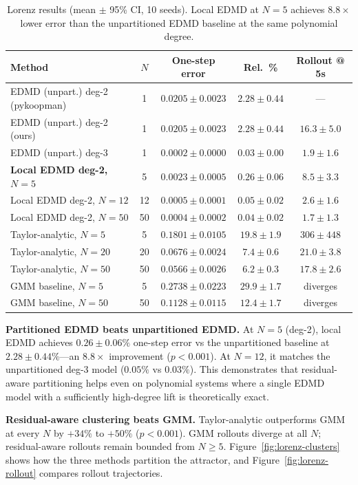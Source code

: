 \documentclass[11pt]{article}
\theoremstyle{definition}
\begin{document}
\begin{table}[H]
\centering\small
\begin{tabular}{lcccc}
\toprule
Method & $N$ & One-step error & Rel.\ \% & Rollout @ 5s \\
\midrule
EDMD (unpart.) deg-2 (pykoopman) & 1  & $0.0205\pm0.0023$ & $2.28\pm0.44$ & --- \\
EDMD (unpart.) deg-2 (ours)      & 1  & $0.0205\pm0.0023$ & $2.28\pm0.44$ & $16.3\pm5.0$ \\
EDMD (unpart.) deg-3             & 1  & $0.0002\pm0.0000$ & $0.03\pm0.00$ & $1.9\pm1.6$ \\
\midrule
\textbf{Local EDMD deg-2, $N\!=\!5$}  & 5  & $\mathbf{0.0023\pm0.0005}$ & $\mathbf{0.26\pm0.06}$ & $\mathbf{8.5\pm3.3}$ \\
Local EDMD deg-2, $N\!=\!12$ & 12 & $0.0005\pm0.0001$ & $0.05\pm0.02$ & $2.6\pm1.6$ \\
Local EDMD deg-2, $N\!=\!50$ & 50 & $0.0004\pm0.0002$ & $0.04\pm0.02$ & $1.7\pm1.3$ \\
\midrule
Taylor-analytic, $N\!=\!5$   & 5  & $0.1801\pm0.0105$ & $19.8\pm1.9$ & $306\pm448$ \\
Taylor-analytic, $N\!=\!20$  & 20 & $0.0676\pm0.0024$ & $7.4\pm0.6$ & $21.0\pm3.8$ \\
Taylor-analytic, $N\!=\!50$  & 50 & $0.0566\pm0.0026$ & $6.2\pm0.3$ & $17.8\pm2.6$ \\
\midrule
GMM baseline, $N\!=\!5$      & 5  & $0.2738\pm0.0223$ & $29.9\pm1.7$ & diverges \\
GMM baseline, $N\!=\!50$     & 50 & $0.1128\pm0.0115$ & $12.4\pm1.7$ & diverges \\
\bottomrule
\end{tabular}
\caption{Lorenz results (mean $\pm$ 95\% CI, 10 seeds). Local EDMD at $N\!=\!5$ achieves $8.8\times$ lower error than the unpartitioned EDMD baseline at the same polynomial degree.}
\label{tab:lorenz}
\end{table}

\textbf{Partitioned EDMD beats unpartitioned EDMD.} At $N=5$ (deg-2), local EDMD achieves $0.26\pm0.06\%$ one-step error vs the unpartitioned baseline at $2.28\pm0.44\%$---an $8.8\times$ improvement ($p<0.001$). At $N=12$, it matches the unpartitioned deg-3 model ($0.05\%$ vs $0.03\%$). This demonstrates that residual-aware partitioning helps even on polynomial systems where a single EDMD model with a sufficiently high-degree lift is theoretically exact.

\textbf{Residual-aware clustering beats GMM.} Taylor-analytic outperforms GMM at every $N$ by $+34\%$ to $+50\%$ ($p<0.001$). GMM rollouts diverge at all $N$; residual-aware rollouts remain bounded from $N\geq 5$. Figure~\ref{fig:lorenz-clusters} shows how the three methods partition the attractor, and Figure~\ref{fig:lorenz-rollout} compares rollout trajectories.
\end{document}
